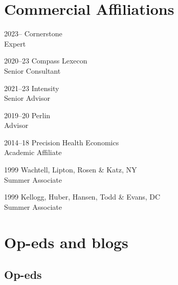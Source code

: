 \documentclass[11pt,letterpaper]{report}
\begin{document}
    \section*{Commercial Affiliations}

    \begin{tablist}

        \item[2023--]   \tab{}Cornerstone \\
                              Expert
    
        \item[2020--23]   \tab{}Compass Lexecon \\
                              Senior Consultant
    
        \item[2021--23]   \tab{}Intensity \\
                              Senior Advisor
    
        \item[2019--20] \tab{}Perlin \\
                              Advisor
    
        \item[2014--18] \tab{}Precision Health Economics \\
                              Academic Affiliate
    
        \item[1999] \tab{}Wachtell, Lipton, Rosen \& Katz, NY \\
                              Summer Associate
                              
        \item[1999] \tab{}Kellogg, Huber, Hansen, Todd \& Evans, DC \\
                              Summer Associate
                              
    \end{tablist}    

    

    

    \section*{Op-eds and blogs}

    \subsection*{Op-eds}
\end{document}
